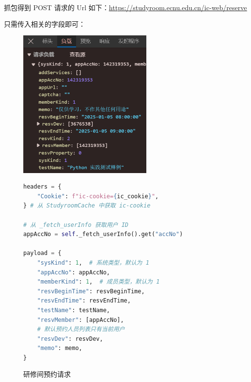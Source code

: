 \documentclass[14pt,a4paper,UTF8,twoside]{article}
\begin{document}
    抓包得到 POST 请求的 Url 如下：\href{https://studyroom.ecnu.edu.cn/ic-web/reserve}{\underline{https://studyroom.ecnu.edu.cn/ic-web/reserve}}

    只需传入相关的字段即可：

    \begin{figure}[H]
        \centering
        \begin{minipage}[H]{0.45\textwidth} %
            \centering
            \includegraphics[width=0.6\textwidth]{img/studyroom_request.png}
            \caption{研修间预约请求}
            \label{fig:studyroom_request}
        \end{minipage}
        \hspace{0.05\textwidth} %
        \begin{minipage}[H]{0.4\textwidth} %
            \centering
            \begin{lstlisting}[language=python, caption={预约请求需要传入的字段}, label={lst:studyroom_request}]
headers = {
    "Cookie": f"ic-cookie={ic_cookie}", 
} # 从 StudyroomCache 中获取 ic-cookie

# 从 _fetch_userInfo 获取用户 ID
appAccNo = self._fetch_userInfo().get("accNo")

payload = {
    "sysKind": 1,  # 系统类型，默认为 1
    "appAccNo": appAccNo,
    "memberKind": 1,  # 成员类型，默认为 1
    "resvBeginTime": resvBeginTime,
    "resvEndTime": resvEndTime,
    "testName": testName,
    "resvMember": [appAccNo],
    # 默认预约人员列表只有当前用户
    "resvDev": resvDev,
    "memo": memo,
}
            \end{lstlisting}
        \end{minipage}
    \end{figure}
\end{document}
